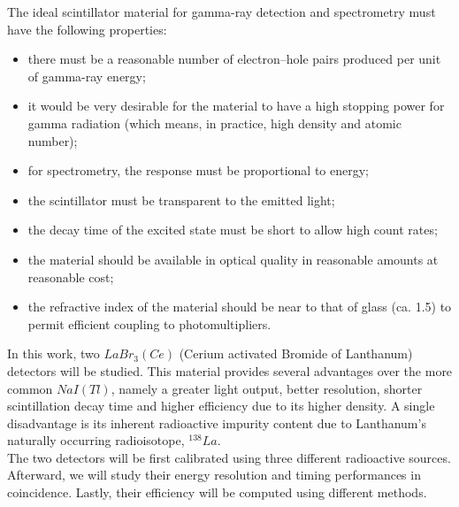 The ideal scintillator material for gamma-ray
detection and spectrometry must have the following properties:
\begin{itemize}
    
    \item there must be a reasonable number of electron–hole pairs produced per unit of gamma-ray energy;
    
    \item it would be very desirable for the material to have a high stopping power for gamma radiation (which means, in practice, high density and atomic number);

    \item for spectrometry, the response must be proportional to energy;

    \item the scintillator must be transparent to the emitted light;

    \item the decay time of the excited state must be short to allow high count rates;

    \item the material should be available in optical quality in reasonable amounts at reasonable cost;

    \item the refractive index of the material should be near to that of glass (ca. 1.5) to permit efficient coupling to photomultipliers.
    
\end{itemize}


In this work, two $LaBr_3(Ce)$ (Cerium activated Bromide of Lanthanum) detectors will be studied. This material provides several advantages over the more common $NaI(Tl)$, namely a greater light output, better resolution, shorter scintillation decay time and higher efficiency due to its higher density.
A single disadvantage is its inherent radioactive impurity content due to Lanthanum's naturally
occurring radioisotope, $^{138}La$. \cite{gilmore_2008}\\

The two detectors will be first calibrated using three different radioactive sources.
Afterward, we will study their energy resolution and timing performances in coincidence. Lastly, their efficiency will be computed using different methods.